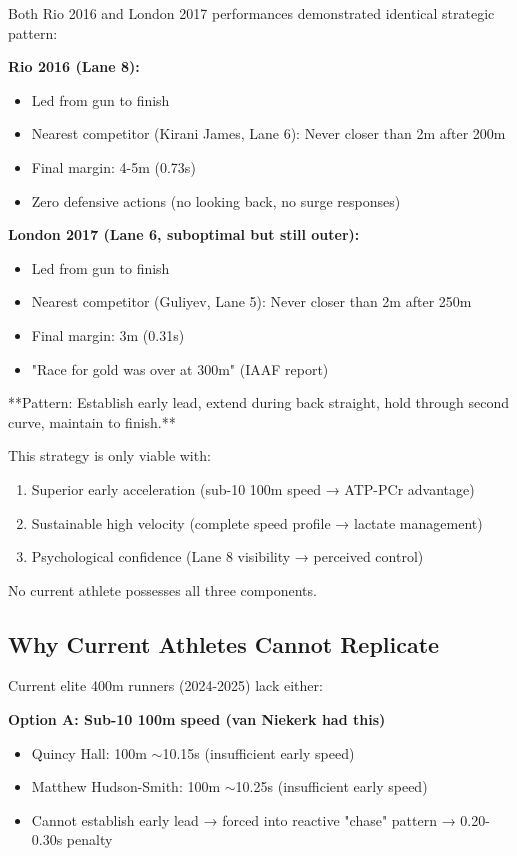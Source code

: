 Both Rio 2016 and London 2017 performances demonstrated identical strategic pattern:

\textbf{Rio 2016 (Lane 8):}
\begin{itemize}
    \item Led from gun to finish
    \item Nearest competitor (Kirani James, Lane 6): Never closer than 2m after 200m
    \item Final margin: 4-5m (0.73s)
    \item Zero defensive actions (no looking back, no surge responses)
\end{itemize}

\textbf{London 2017 (Lane 6, suboptimal but still outer):}
\begin{itemize}
    \item Led from gun to finish
    \item Nearest competitor (Guliyev, Lane 5): Never closer than 2m after 250m
    \item Final margin: 3m (0.31s)
    \item "Race for gold was over at 300m" (IAAF report)
\end{itemize}

**Pattern: Establish early lead, extend during back straight, hold through second curve, maintain to finish.**

This strategy is only viable with:
\begin{enumerate}
    \item Superior early acceleration (sub-10 100m speed → ATP-PCr advantage)
    \item Sustainable high velocity (complete speed profile → lactate management)
    \item Psychological confidence (Lane 8 visibility → perceived control)
\end{enumerate}

No current athlete possesses all three components.

\subsection{Why Current Athletes Cannot Replicate}

Current elite 400m runners (2024-2025) lack either:

\textbf{Option A: Sub-10 100m speed (van Niekerk had this)}
\begin{itemize}
    \item Quincy Hall: 100m $\sim$10.15s (insufficient early speed)
    \item Matthew Hudson-Smith: 100m $\sim$10.25s (insufficient early speed)
    \item Cannot establish early lead → forced into reactive "chase" pattern → 0.20-0.30s penalty
\end{itemize}

